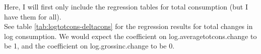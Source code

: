 \documentclass[12pt,a4paper]{article}
\begin{document}
Here, I will first only include the regression tables for total consumption (but I have them for all). \\

See table  \ref{tab:logtotcons-deltacons} for the regression results for total changes in log consumption. We would expect the coefficient on log.averagetotcons.change to be 1, and the coefficient on log.grossinc.change to be 0. \\


%  
% 
% 
% 
\end{document}
